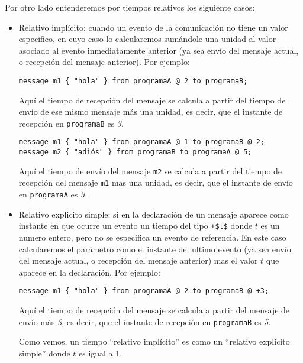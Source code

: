 Por otro lado entenderemos por tiempos relativos los siguiente casos:

\begin{itemize}
\item Relativo implícito: cuando un evento de la comunicación no tiene
  un valor especifico, en cuyo caso lo calcularemos sumándole una unidad al
  valor asociado al evento inmediatamente anterior (ya sea envío del
  mensaje actual, o recepción del mensaje anterior). Por ejemplo:

  \begin{lstlisting}
message m1 { "hola" } from programaA @ 2 to programaB;
  \end{lstlisting}

  Aquí el tiempo de recepción del mensaje se calcula a partir del
  tiempo de envío de ese mismo mensaje más una unidad, es decir, que
  el instante de recepción en \lstinline{programaB} es \textit{3}.

  \begin{lstlisting}
message m1 { "hola" } from programaA @ 1 to programaB @ 2;
message m2 { "adiós" } from programaB to programaA @ 5;
  \end{lstlisting}

  Aquí el tiempo de envío del mensaje \lstinline{m2} se calcula a partir
  del tiempo de recepción del mensaje \lstinline{m1} mas una unidad, es
  decir, que el instante de envío en \lstinline{programaA} es \textit{3}.

\item Relativo explicito simple: si en la declaración de un mensaje
  aparece como instante en que ocurre un evento un tiempo del tipo
  \lstinline[mathescape]{+$t$} donde $t$ es un numero entero, pero no
  se especifica un evento de referencia. En este caso calcularemos el
  parámetro como el instante del ultimo evento (ya sea envío del
  mensaje actual, o recepción del mensaje anterior) mas el valor $t$
  que aparece en la declaración. Por ejemplo:
      
  \begin{lstlisting}
message m1 { "hola" } from programaA @ 2 to programaB @ +3;
  \end{lstlisting}
      
  Aquí el tiempo de recepción del mensaje se calcula a partir del
  mensaje de envío más \textit{3}, es decir, que el instante de
  recepción en \lstinline{programaB} es \textit{5}.

  Como vemos, un tiempo ``relativo implícito'' es como un ``relativo
  explícito simple'' donde $t$ es igual a 1.
 

\end{itemize}
